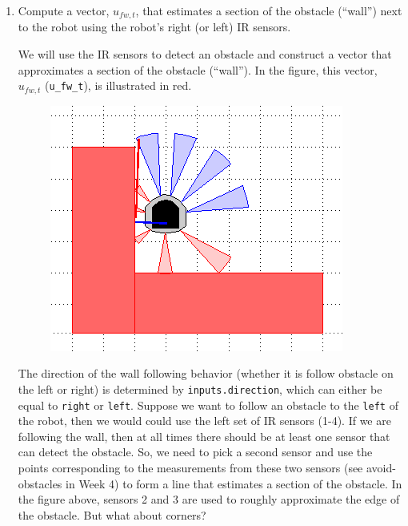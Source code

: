 \documentclass[10pt]{article}
\begin{document}
\begin{enumerate}
	\item Compute a vector, $u_{fw,t}$, that estimates a section of the obstacle (``wall'') next to the robot using the robot's right (or left) IR sensors.
	
	We will use the IR sensors to detect an obstacle and construct a vector that approximates a section of the obstacle (``wall''). In the figure, this vector, $u_{fw,t}$ (\texttt{u\_fw\_t}), is illustrated in red.
	
	\begin{figure}[h]
		\centering
		\includegraphics[scale=0.5]{week-6-part-1.png}
		\label{fig:week6part1}
	\end{figure}
	
	The direction of the wall following behavior (whether it is follow obstacle on the left or right) is determined by \texttt{inputs.direction}, which can either be equal to \texttt{right} or \texttt{left}. Suppose we want to follow an obstacle to the \texttt{left} of the robot, then we would could use the left set of IR sensors (1-4). If we are following the wall, then at all times there should be at least one sensor that can detect the obstacle. So, we need to pick a second sensor and use the points corresponding to the measurements from these two sensors (see avoid-obstacles in Week 4) to form a line that estimates a section of the obstacle. In the figure above, sensors 2 and 3 are used to roughly approximate the edge of the obstacle. But what about corners?
	

\end{enumerate}
\end{document}
